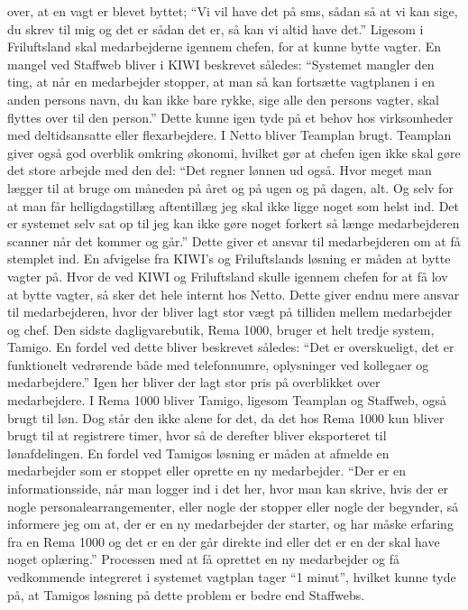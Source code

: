over, at en vagt er blevet byttet; “Vi vil have det på sms, sådan så at vi kan sige, du skrev til mig og det er sådan det er, så kan vi altid have det.” Ligesom i Friluftsland skal medarbejderne igennem chefen, for at kunne bytte vagter.
En mangel ved Staffweb bliver i KIWI beskrevet således: “Systemet mangler den ting, at når en medarbejder stopper, at man så kan fortsætte vagtplanen i en anden persons navn, du kan ikke bare rykke, sige alle den persons vagter, skal flyttes over til den person.” Dette kunne igen tyde på et behov hos virksomheder med deltidsansatte eller flexarbejdere.
I Netto bliver Teamplan brugt. Teamplan giver også god overblik omkring økonomi, hvilket gør at chefen igen ikke skal gøre det store arbejde med den del: “Det regner lønnen ud også. Hvor meget man lægger til at bruge om måneden på året og på ugen og på dagen, alt. Og selv for at man får helligdagstillæg aftentillæg jeg skal ikke ligge noget som helst ind. Det er systemet selv sat op til jeg kan ikke gøre noget forkert så længe medarbejderen scanner når det kommer og går.” Dette giver et ansvar til medarbejderen om at få stemplet ind. En afvigelse fra KIWI’s og Friluftslands løsning er måden at bytte vagter på. Hvor de ved KIWI og Friluftsland skulle igennem chefen for at få lov at bytte vagter, så sker det hele internt hos Netto. Dette giver endnu mere ansvar til medarbejderen, hvor der bliver lagt stor vægt på tilliden mellem medarbejder og chef.
Den sidste dagligvarebutik, Rema 1000, bruger et helt tredje system, Tamigo. En fordel ved dette bliver beskrevet således: “Det er overskueligt, det er funktionelt vedrørende både med telefonnumre, oplysninger ved kollegaer og medarbejdere.” Igen her bliver der lagt stor pris på overblikket over medarbejdere. I Rema 1000 bliver Tamigo, ligesom Teamplan og Staffweb, også brugt til løn. Dog står den ikke alene for det, da det hos Rema 1000 kun bliver brugt til at registrere timer, hvor så de derefter bliver eksporteret til lønafdelingen. En fordel ved Tamigos løsning er måden at afmelde en medarbejder som er stoppet eller oprette en ny medarbejder.
“Der er en informationsside, når man logger ind i det her, hvor man kan skrive, hvis der er nogle personalearrangementer, eller nogle der stopper eller nogle der begynder, så informere jeg om at, der er en ny medarbejder der starter, og har måske erfaring fra en Rema 1000 og det er en der går direkte ind eller det er en der skal have noget oplæring.” Processen med at få oprettet en ny medarbejder og få vedkommende integreret i systemet vagtplan tager “1 minut”, hvilket kunne tyde på, at Tamigos løsning på dette problem er bedre end Staffwebs.

